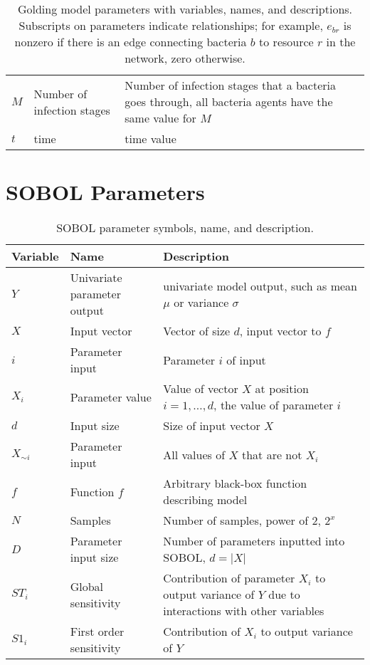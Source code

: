 \begin{table}[h!]
\begin{tabularx}{\textwidth}{l l X}
        $M$ & Number of infection stages & Number of infection stages that a bacteria goes through, all bacteria agents have the same value for $M$\\
        $t$ & time & time value \\
        \bottomrule
    \end{tabularx}\newline
    \caption{
        Golding model parameters with variables, names, and descriptions. 
        Subscripts on parameters indicate relationships; for example, $e_{b r}$ is nonzero if there is an edge connecting bacteria $b$ to resource $r$ in the network, zero otherwise.
    }
    \label{tab:appendixA:parameter_table_simple_golding_model}
\end{table}


\section{SOBOL Parameters}
\begin{table}[h!]
    \small %
    \centering
    \begin{tabularx}{\textwidth}{l l X}
        \toprule
        \textbf{Variable} & \textbf{Name} & \textbf{Description} \\
        \midrule
        $Y$ & Univariate parameter output & univariate model output, such as mean $\mu$ or variance $\sigma$ \\
        $X$ & Input vector & Vector of size $d$, input vector to $f$ \\
        $i$ & Parameter input & Parameter $i$ of input \\
        $X_i$ & Parameter value & Value of vector $X$ at position $i=1, \dots, d$, the value of parameter $i$ \\
        $d$ & Input size & Size of input vector $X$ \\
        $X_{\sim i}$ & Parameter input & All values of $X$ that are not $X_i$ \\
        $f$ & Function $f$ & Arbitrary black-box function describing model \\
        $N$ & Samples & Number of samples, power of 2, $2^x$ \\
        $D$ & Parameter input size & Number of parameters inputted into SOBOL, $d=|X|$ \\
        $ST_i$ & Global sensitivity & Contribution of parameter $X_i$ to output variance of $Y$ due to interactions with other variables \\
        $S1_i$ & First order sensitivity & Contribution of $X_i$ to output variance of $Y$ \\
        \bottomrule
    \end{tabularx} \newline
    \caption{
        SOBOL parameter symbols, name, and description.
    }
    \label{tab:appendixA:parameter_table_SOBOL}
\end{table}

